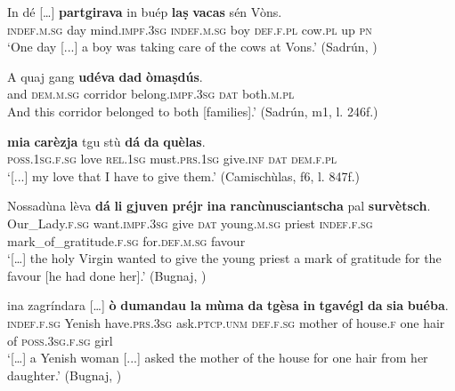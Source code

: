 \ea\label{ex:trans2}
\gll    In dé […] \textbf{partgirava} in buép {\ob}\textbf{laṣ} \textbf{vacas}{\cb} sén Vòns.\\
     \textsc{indef.m.sg} day {} mind.\textsc{impf.3sg} \textsc{indef.m.sg} boy \textsc{def.f.pl} cow.\textsc{pl} up \textsc{pn}\\
\glt `One day [...] a boy was taking care of the cows at Vons.' (Sadrún, \citealt[103]{Büchli1966})
\z

\ea
\label{ex:trans:indir}
\gll    A quaj gang \textbf{udéva} {\ob}\textbf{dad} \textbf{òmaṣdús}{\cb}.\\
and \textsc{dem.m.sg} corridor belong.\textsc{impf.3sg} \textsc{dat} both.\textsc{m.pl}\\
\glt And this corridor belonged to both [families].' (Sadrún, m1, l. 246f.)
\z

\ea
\label{ex:ditrans1}
\gll    [...] {\ob}\textbf{mia} \textbf{carèzja} {\cb}tgu stù \textbf{dá} {\ob}\textbf{da} \textbf{quèlas}{\cb}.\\
{} \textsc{poss.1sg.f.sg} love \textsc{rel.1sg} must.\textsc{prs.1sg} give.\textsc{inf} \textsc{dat} \textsc{dem.f.pl}\\
\glt `[...] my love that I have to give them.' (Camischùlas, f6, l. 847f.)
\z

\ea\label{ex:ditrans2}
\gll    […] Nossadùna lèva \textbf{dá} {\ob}\textbf{li} \textbf{gjuven} \textbf{préjr}{\cb} {\ob}\textbf{ina} \textbf{rancùnusciantscha} pal \textbf{survètsch}{\cb}.\\
   {}  Our\_Lady.\textsc{f.sg} want.\textsc{impf.3sg} give \textsc{dat} young.\textsc{m.sg} priest \textsc{indef.f.sg} mark\_of\_gratitude.\textsc{f.sg} for.\textsc{def.m.sg} favour \\
\glt `[…] the holy Virgin wanted to give the young priest a mark of gratitude for the favour [he had done her].' (Bugnaj, \citealt[145]{Büchli1966})
\z

\ea
\label{ex:trans:2DO}
\gll  [...]  ina zagríndara […] \textbf{ò} \textbf{dumandau} {\ob}\textbf{la} \textbf{mùma} \textbf{da} \textbf{tgèsa}{\cb} {\ob}\textbf{in} \textbf{tgavégl} \textbf{da} \textbf{sia} \textbf{buéba}{\cb}. \\
{} \textsc{indef.f.sg} Yenish {} have.\textsc{prs.3sg}   ask.\textsc{ptcp.unm} \textsc{def.f.sg} mother of house.\textsc{f} one hair of \textsc{poss.3sg.f.sg} girl \\
\glt `[…] a Yenish woman [...] asked the mother of the house for one hair from her daughter.' (Bugnaj, \citealt[131]{Büchli1966})
\z



